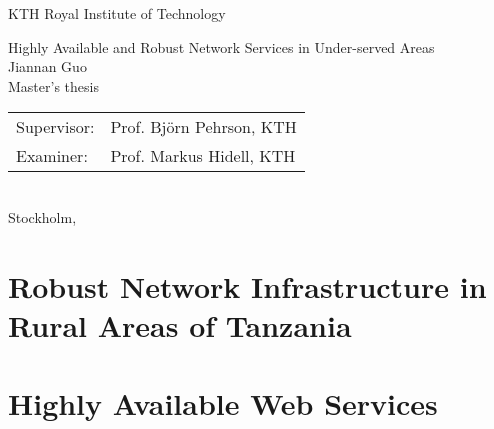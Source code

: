 \documentclass[a4paper,11pt]{report}
\author{Jiannan Guo}
\begin{document}
\begin{titlepage}
\thispagestyle{empty}

\begin{center}
  \vspace{0.5cm}
  \Large{\sc KTH Royal Institute of Technology}\\
  \vspace{3cm}

  \vspace{0.5cm}
  \Large{Highly Available and Robust Network Services in Under-served Areas}\\
  \vspace{2cm}  
  \large{\sc Jiannan Guo}\\
  \vspace{3cm}
  Master's thesis\\
  \vspace{0.5cm}
  \begin{tabular}{ll} 
    Supervisor: & Prof. Bj\"{o}rn Pehrson, KTH\\		
	Examiner:  & Prof. Markus Hidell, KTH\\ 
  \end{tabular}
  \vspace{1cm}
  \\Stockholm, \\
\end{center} 

\end{titlepage}

\pagestyle{plain}
%

\cleardoublepage
{}
\pagestyle{fancy}

\part{Robust Network Infrastructure in Rural Areas of Tanzania}

\part{Highly Available Web Services}






\cleardoublepage
{}
{}



%
\end{document}
